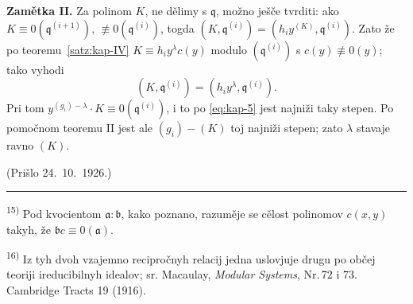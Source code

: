 \documentclass[11pt]{article}
\newcommand{\foreign}[1]{#1}
\theoremstyle{plain}
\begin{document}
\textbf{Zamětka II.} Za polinom $K$, ne dělimy s $\mathfrak{q}$,
možno ješče tvrditi: ako
$K \equiv 0(\mathfrak{q}^{(i+1)})$,
$\not\equiv 0(\mathfrak{q}^{(i)})$, togda
$(K, \mathfrak{q}^{(i)}) = (h_{i}y^{(K)}, \mathfrak{q}^{(i)})$.
Zato že po teoremu~\ref{satz:kap-IV}
$K \equiv h_{i}y^{\lambda}c(y)$ modulo
$(\mathfrak{q}^{(i)})$ s $c(y) \not\equiv 0(y)$; tako vyhodi
\[
(K, \mathfrak{q}^{(i)}) = (h_{i}y^{\lambda}, \mathfrak{q}^{(i)}).
\]
Pri tom $y^{(g_{i})-\lambda} \cdot K \equiv 0(\mathfrak{q}^{(i)})$,
i to po \eqref{eq:kap-5} jest najniži taky stepen. Po pomočnom
teoremu II jest ale $(g_{i}) - (K)$ toj najniži stepen; zato
$\lambda$ stavaje ravno $(K)$.

\vfill
\begin{flushright}
(Prišlo 24.\ 10.\ 1926.)
\end{flushright}

\vspace{0.5em}
\noindent\rule{\textwidth}{0.4pt}
\vspace{0.3em}

{\footnotesize
\textsuperscript{15)} Pod kvocientom $\mathfrak{a}:\mathfrak{b}$, kako poznano,
razuměje se cělost polinomov $c(x,y)$ takyh, že
$\mathfrak{b}c \equiv 0(\mathfrak{a})$.

\textsuperscript{16)} Iz tyh dvoh vzajemno recipročnyh relacij jedna uslovjuje
drugu po občej teoriji ireducibilnyh idealov; sr. Macaulay,
\textit{\foreign{Modular Systems}}, Nr.\,72 i 73. \foreign{Cambridge Tracts} 19 (1916).
}
\end{document}
